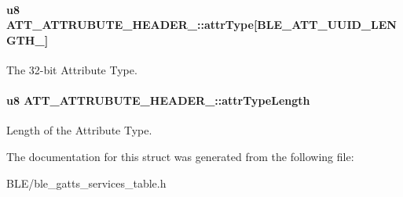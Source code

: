 \paragraph[{\texorpdfstring{attr\+Type}{attrType}}]{\setlength{\rightskip}{0pt plus 5cm}u8 A\+T\+T\+\_\+\+A\+T\+T\+R\+U\+B\+U\+T\+E\+\_\+\+H\+E\+A\+D\+E\+R\+\_\+::attr\+Type\mbox{[}{\bf B\+L\+E\+\_\+\+A\+T\+T\+\_\+\+U\+U\+I\+D\+\_\+\+L\+E\+N\+G\+T\+H\+\_}\mbox{]}}\hypertarget{struct_a_t_t___a_t_t_r_u_b_u_t_e___h_e_a_d_e_r__4_a890e74c9f158d26805415c7e192c9f7d}{}\label{struct_a_t_t___a_t_t_r_u_b_u_t_e___h_e_a_d_e_r__4_a890e74c9f158d26805415c7e192c9f7d}
The 32-\/bit Attribute Type. 
\paragraph[{\texorpdfstring{attr\+Type\+Length}{attrTypeLength}}]{\setlength{\rightskip}{0pt plus 5cm}u8 A\+T\+T\+\_\+\+A\+T\+T\+R\+U\+B\+U\+T\+E\+\_\+\+H\+E\+A\+D\+E\+R\+\_\+::attr\+Type\+Length}\hypertarget{struct_a_t_t___a_t_t_r_u_b_u_t_e___h_e_a_d_e_r__4_aa422c1951e207206cf6fc515b1059ba9}{}\label{struct_a_t_t___a_t_t_r_u_b_u_t_e___h_e_a_d_e_r__4_aa422c1951e207206cf6fc515b1059ba9}
Length of the Attribute Type. 

The documentation for this struct was generated from the following file\+:\begin{DoxyCompactItemize}
\item 
B\+L\+E/ble\+\_\+gatts\+\_\+services\+\_\+table.\+h\end{DoxyCompactItemize}
